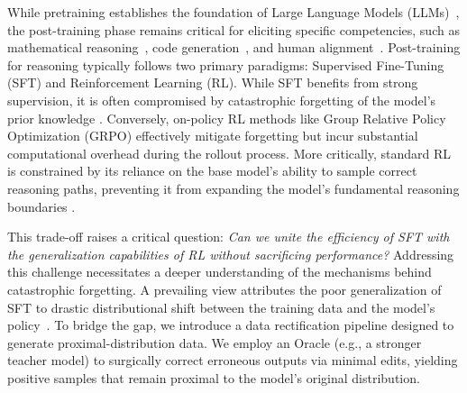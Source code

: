\documentclass{article}
\theoremstyle{plain}
\theoremstyle{definition}
\theoremstyle{remark}
\begin{document}
While pretraining establishes the foundation of Large Language Models (LLMs)~\cite{achiam2023gpt,comanici2025gemini,yang2025qwen3}, the post-training phase remains critical for eliciting specific competencies, such as mathematical reasoning~\cite{shao2024deepseekmath}, code generation~\cite{anthropic2024claude}, and human alignment~\cite{ouyang2022training,zhou2023instruction}. Post-training for reasoning typically follows two primary paradigms: Supervised Fine-Tuning (SFT) and Reinforcement Learning (RL). While SFT benefits from strong supervision, it is often compromised by catastrophic forgetting of the model’s prior knowledge \cite{chu2025sft,huan2025does}. Conversely, on-policy RL methods like Group Relative Policy Optimization (GRPO) \cite{shao2024deepseekmath} effectively mitigate forgetting but incur substantial computational overhead during the rollout process. More critically, standard RL is constrained by its reliance on the base model’s ability to sample correct reasoning paths, preventing it from expanding the model's fundamental reasoning boundaries \cite{yue2025does}.

This trade-off raises a critical question: \textit{Can we unite the efficiency of SFT with the generalization capabilities of RL without sacrificing performance?} Addressing this challenge necessitates a deeper understanding of the mechanisms behind catastrophic forgetting. A prevailing view attributes the poor generalization of SFT to drastic distributional shift between the training data and the model's policy~\cite{chen2025retaining,shenfeld2025rl}. To bridge the gap, we introduce a data rectification pipeline designed to generate proximal-distribution data. We employ an Oracle (e.g., a stronger teacher model) to surgically correct erroneous outputs via minimal edits, yielding positive samples that remain proximal to the model's original distribution.
\end{document}
